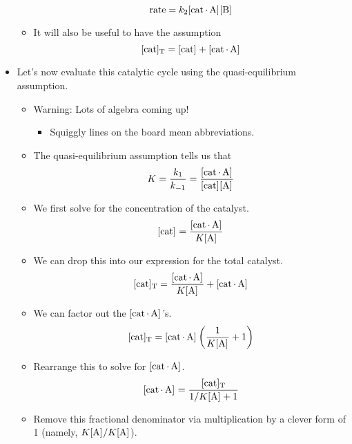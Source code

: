 \documentclass[../notes.tex]{subfiles}
\begin{document}
\begin{itemize}
\begin{itemize}
        \begin{equation*}
            \rate = k_2\cnc{cat*A}\cnc{B}
        \end{equation*}
        \item It will also be useful to have the assumption
        \begin{equation*}
            \cnc[T]{cat} = \cnc{cat}+\cnc{cat*A}
        \end{equation*}
    \end{itemize}
    \item Let's now evaluate this catalytic cycle using the quasi-equilibrium assumption.
    \begin{itemize}
        \item Warning: Lots of algebra coming up!
        \begin{itemize}
            \item Squiggly lines on the board mean abbreviations.
        \end{itemize}
        \item The quasi-equilibrium assumption tells us that
        \begin{equation*}
            K = \frac{k_1}{k_{-1}}
            = \frac{\cnc{cat*A}}{\cnc{cat}\cnc{A}}
        \end{equation*}
        \item We first solve for the concentration of the catalyst.
        \begin{equation*}
            \cnc{cat} = \frac{\cnc{cat*A}}{K\cnc{A}}
        \end{equation*}
        \item We can drop this into our expression for the total catalyst.
        \begin{equation*}
            \cnc[T]{cat} = \frac{\cnc{cat*A}}{K\cnc{A}}+\cnc{cat*A}
        \end{equation*}
        \item We can factor out the $\cnc{cat*A}$'s.
        \begin{equation*}
            \cnc[T]{cat} = \cnc{cat*A}\left( \frac{1}{K\cnc{A}}+1 \right)
        \end{equation*}
        \item Rearrange this to solve for $\cnc{cat*A}$.
        \begin{equation*}
            \cnc{cat*A} = \frac{\cnc[T]{cat}}{1/K\cnc{A}+1}
        \end{equation*}
        \item Remove this fractional denominator via multiplication by a clever form of 1 (namely, $K\cnc{A}/K\cnc{A}$).

\end{itemize}
\end{itemize}
\end{document}

